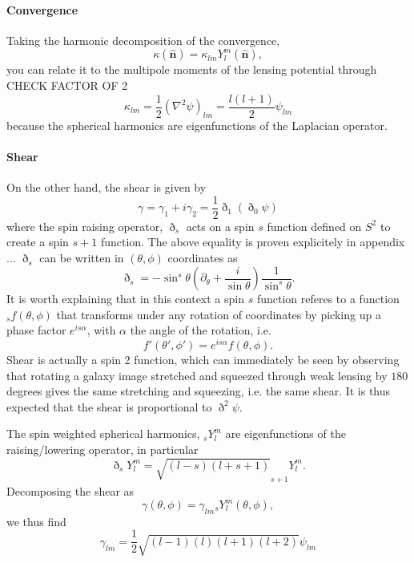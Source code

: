 \documentclass[11pt]{article} %
\begin{document}
\paragraph{Convergence}

Taking the harmonic decomposition of the convergence,
\begin{equation}
    \kappa(\hat{\mathbf n}) = \kappa_{lm}Y_l^m(\hat{\mathbf n}),
\end{equation}
you can relate it to the multipole moments of the lensing potential through CHECK FACTOR OF 2
\begin{equation}
    \kappa_{lm} = \frac{1}{2}(\nabla^2\psi)_{lm} = \frac{l(l+1)}{2}\psi_{lm}
\end{equation}
because the spherical harmonics are eigenfunctions of the Laplacian operator.

\paragraph{Shear}
On the other hand, the shear is given by
\begin{equation}
    \gamma = \gamma_1 + i\gamma_2 = \frac{1}{2}\eth_1(\eth_0\psi)
\end{equation}
where the spin raising operator, $\eth_s$ acts on a spin $s$ function defined on $S^2$ to create a spin $s+1$ function. The above equality is proven explicitely in appendix ... %
$\eth_s$ can be written in $(\theta, \phi)$ coordinates as
\begin{equation}
    \eth_s = -\sin^s\theta(\partial_\theta + \frac{i}{\sin\theta})\frac{1}{\sin^s\theta}.
\end{equation}
It is worth explaining that in this context a spin $s$ function referes to a function $_sf(\theta, \phi)$ that transforms under any rotation of coordinates by picking up a phase factor $e^{is\alpha}$, with $\alpha$ the angle of the rotation, i.e.
\begin{equation}
    f'(\theta', \phi') = e^{is\alpha}f(\theta, \phi).
\end{equation}
Shear is actually a spin 2 function, which can immediately be seen by observing that rotating a galaxy image stretched and squeezed through weak lensing by $180$ degrees gives the same stretching and squeezing, i.e. the same shear. It is thus expected that the shear is proportional to $\eth^2\psi$. 

The spin weighted spherical harmonics, $_sY_l^m$ are eigenfunctions of the raising/lowering operator, in particular
\begin{equation}
    \eth_sY_l^m = \sqrt{(l-s)(l+s+1)} _{s+1}Y_l^m.
\end{equation}
Decomposing the shear as
\begin{equation}
    \gamma(\theta, \phi) = \gamma_{lm} {}_sY_l^m(\theta,\phi),
\end{equation}
we thus find
\begin{equation}
    \gamma_{lm} = \frac{1}{2}\sqrt{(l-1)(l)(l+1)(l+2)} \psi_{lm}
\end{equation}
\end{document}
